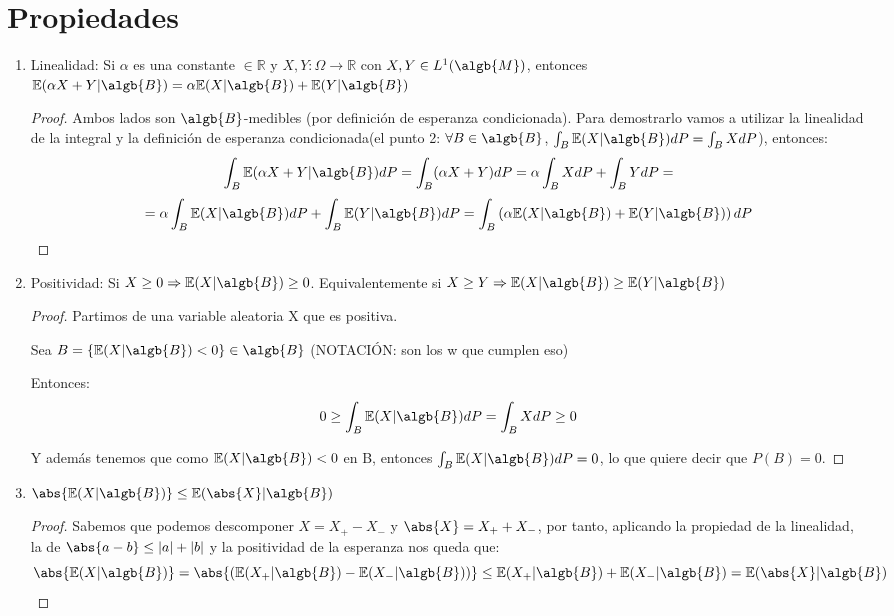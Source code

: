 \documentclass{apuntes}
\begin{document}
\section{Propiedades}
\begin{enumerate}
\item Linealidad: Si $\alpha$ es una constante $\in \mathbb{R}$ y $X,Y:\Omega \rightarrow \mathbb{R}$ con $X,Y \in L^1(\algb{M})$, entonces $\mathbb{E}(\alpha X + Y|\algb{B})=\alpha\mathbb{E}(X|\algb{B})+\mathbb{E}(Y|\algb{B})$

\begin{proof}
Ambos lados son $\algb{B}$-medibles (por definición de esperanza condicionada). Para demostrarlo vamos a utilizar la linealidad de la integral y la definición de esperanza condicionada(el punto 2: $\forall B \in \algb{B}$, $\int_{B}\mathbb{E}(X|\algb{B})dP=\int_{B}XdP$), entonces:
\[
\int_B \mathbb{E}(\alpha X + Y|\algb{B})dP= \int_B(\alpha X+Y)dP=\alpha\int_B XdP + \int_B YdP= 
\]
\[
=\alpha\int_B \mathbb{E}(X|\algb{B})dP + \int_B \mathbb{E}(Y|\algb{B})dP = \int_B \left(\alpha\mathbb{E}(X|\algb{B}) + \mathbb{E}(Y|\algb{B})\right)dP
\] 
\end{proof}
\item Positividad: Si $X \geq 0 \Rightarrow \mathbb{E}(X|\algb{B})\geq 0$. Equivalentemente si  $X \geq Y \Rightarrow \mathbb{E}(X|\algb{B})\geq \mathbb{E}(Y|\algb{B})$
\begin{proof}
Partimos de una variable aleatoria X que es positiva.

Sea $B=\{\mathbb{E}(X|\algb{B}) < 0\} \in \algb{B}$ (NOTACIÓN: son los w que cumplen eso)

Entonces:
\[
0 \geq  \int_B \mathbb{E}(X|\algb{B})dP = \int_B XdP \geq 0
\]

Y además tenemos que como $\mathbb{E}(X|\algb{B})<0$ en B, entonces $\int_B \mathbb{E}(X|\algb{B})dP=0$, lo que quiere decir que $P(B)=0$.
\end{proof}
\item $\abs{\mathbb{E}(X|\algb{B})} \leq \mathbb{E}(\abs{X}|\algb{B})$

\begin{proof}
Sabemos que podemos descomponer $X=X_+ - X_-$ y $\abs{X}=X_++X_-$, por tanto, aplicando la propiedad de la linealidad, la de $\abs{a-b} \leq |a|+|b|$ y la positividad de la esperanza nos queda que:
\[
\abs{\mathbb{E}(X|\algb{B})}=\abs{\left( \mathbb{E}(X_+|\algb{B}) - \mathbb{E}(X_-|\algb{B}) \right)} \leq \mathbb{E}(X_+|\algb{B})+\mathbb{E}(X_-|\algb{B})= \mathbb{E}(\abs{X}|\algb{B})
\]
 

\end{proof}
\end{enumerate}
\end{document}
